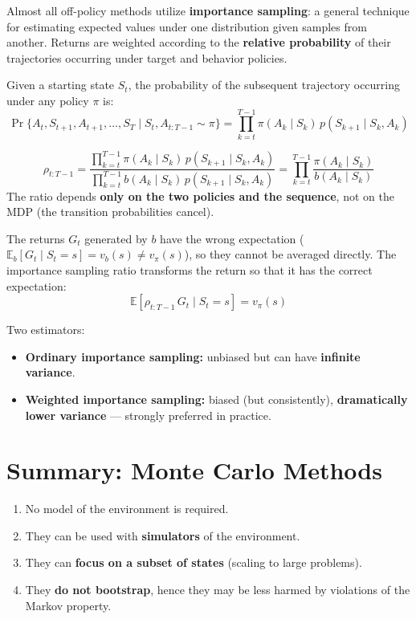 \documentclass[11pt,a4paper]{article}
\theoremstyle{definition}
\theoremstyle{plain}
\theoremstyle{remark}
\begin{document}
Almost all off-policy methods utilize \textbf{importance sampling}: a general technique for estimating expected values under one distribution given samples from another. Returns are weighted according to the \textbf{relative probability} of their trajectories occurring under target and behavior policies.

Given a starting state $S_t$, the probability of the subsequent trajectory occurring under any policy $\pi$ is:
\[
    \Pr\{A_t, S_{t+1}, A_{t+1}, \ldots, S_T \mid S_t, A_{t:T-1} \sim \pi\}
    = \prod_{k=t}^{T-1} \pi(A_k \mid S_k)\, p(S_{k+1} \mid S_k, A_k)
\]

\begin{tcolorbox}[colback=blue!5!white, colframe=blue!60!black, title={Importance Sampling Ratio}]
\[
    \rho_{t:T-1} = \frac{\displaystyle\prod_{k=t}^{T-1} \pi(A_k \mid S_k)\, p(S_{k+1} \mid S_k, A_k)}{\displaystyle\prod_{k=t}^{T-1} b(A_k \mid S_k)\, p(S_{k+1} \mid S_k, A_k)} = \prod_{k=t}^{T-1} \frac{\pi(A_k \mid S_k)}{b(A_k \mid S_k)}
\]
The ratio depends \textbf{only on the two policies and the sequence}, not on the MDP (the transition probabilities cancel).
\end{tcolorbox}

The returns $G_t$ generated by $b$ have the wrong expectation ($\mathbb{E}_b[G_t \mid S_t = s] = v_b(s) \neq v_\pi(s)$), so they cannot be averaged directly. The importance sampling ratio transforms the return so that it has the correct expectation:
\[
    \mathbb{E}[\rho_{t:T-1}\, G_t \mid S_t = s] = v_\pi(s)
\]

Two estimators:
\begin{itemize}
    \item \textbf{Ordinary importance sampling:} unbiased but can have \textbf{infinite variance}.
    \item \textbf{Weighted importance sampling:} biased (but consistently), \textbf{dramatically lower variance} — strongly preferred in practice.
\end{itemize}

\section{Summary: Monte Carlo Methods}

\begin{tcolorbox}[colback=green!5!white, colframe=green!60!black, title={Four Advantages of MC over DP}]
\begin{enumerate}
    \item No model of the environment is required.
    \item They can be used with \textbf{simulators} of the environment.
    \item They can \textbf{focus on a subset of states} (scaling to large problems).
    \item They \textbf{do not bootstrap}, hence they may be less harmed by violations of the Markov property.
\end{enumerate}
\end{tcolorbox}
\end{document}
